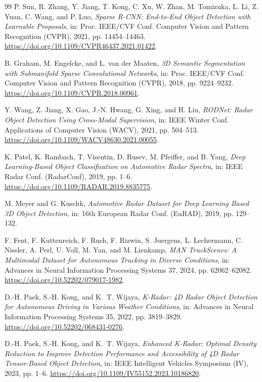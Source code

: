 \begin{thebibliography}{99}
P. Sun, R. Zhang, Y. Jiang, T. Kong, C. Xu, W. Zhan, M. Tomizuka, L. Li,
Z. Yuan, C. Wang, and P. Luo,
\emph{Sparse R-CNN: End-to-End Object Detection with Learnable Proposals},
in: Proc. IEEE/CVF Conf. Computer Vision and Pattern Recognition (CVPR),
2021, pp. 14454--14463.
\url{https://doi.org/10.1109/CVPR46437.2021.01422}.

B. Graham, M. Engelcke, and L. van der Maaten,
\emph{3D Semantic Segmentation with Submanifold Sparse Convolutional
Networks}, in: Proc. IEEE/CVF Conf. Computer Vision and Pattern Recognition
(CVPR), 2018, pp. 9224--9232.
\url{https://doi.org/10.1109/CVPR.2018.00961}.

Y. Wang, Z. Jiang, X. Gao, J.-N. Hwang, G. Xing, and H. Liu,
\emph{RODNet: Radar Object Detection Using Cross-Modal Supervision},
in: IEEE Winter Conf. Applications of Computer Vision (WACV), 2021,
pp. 504--513.
\url{https://doi.org/10.1109/WACV48630.2021.00055}.

K. Patel, K. Rambach, T. Visentin, D. Rusev, M. Pfeiffer, and B. Yang,
\emph{Deep Learning-Based Object Classification on Automotive Radar
Spectra}, in: IEEE Radar Conf. (RadarConf), 2019, pp. 1--6.
\url{https://doi.org/10.1109/RADAR.2019.8835775}.

M. Meyer and G. Kuschk,
\emph{Automotive Radar Dataset for Deep Learning Based 3D Object Detection},
in: 16th European Radar Conf. (EuRAD), 2019, pp. 129--132.

F. Fent, F. Kuttenreich, F. Ruch, F. Rizwin, S. Juergens, L. Lechermann,
C. Nissler, A. Perl, U. Voll, M. Yan, and M. Lienkamp,
\emph{MAN TruckScenes: A Multimodal Dataset for Autonomous Trucking in
Diverse Conditions}, in: Advances in Neural Information Processing Systems
37, 2024, pp. 62062--62082.
\url{https://doi.org/10.52202/079017-1982}.

D.-H. Paek, S.-H. Kong, and K.~T. Wijaya,
\emph{K-Radar: 4D Radar Object Detection for Autonomous Driving in Various
Weather Conditions}, in: Advances in Neural Information Processing Systems
35, 2022, pp. 3819--3829.
\url{https://doi.org/10.52202/068431-0276}.

D.-H. Paek, S.-H. Kong, and K.~T. Wijaya,
\emph{Enhanced K-Radar: Optimal Density Reduction to Improve Detection
Performance and Accessibility of 4D Radar Tensor-Based Object Detection},
in: IEEE Intelligent Vehicles Symposium (IV), 2023, pp. 1--6.
\url{https://doi.org/10.1109/IV55152.2023.10186820}.


\end{thebibliography}
